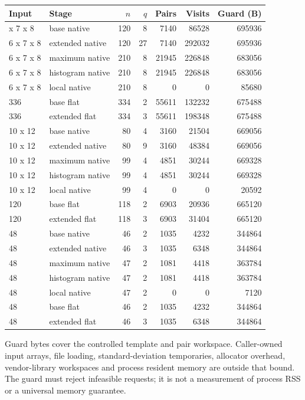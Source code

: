 \documentclass[
  english,
  11pt,
]{article}
\newcounter{none} %
\begin{document}
{\def\LTcaptype{none} %
\begin{longtable}[]{@{}llrrrrr@{}}
\toprule\noalign{}
Input & Stage & \(n\) & \(q\) & Pairs & Visits & Guard (B) \\
\midrule\noalign{}
\endhead
\bottomrule\noalign{}
\endlastfoot
6 x 7 x 8 & base native & 120 & 8 & 7140 & 86528 & 695936 \\
6 x 7 x 8 & extended native & 120 & 27 & 7140 & 292032 & 695936 \\
6 x 7 x 8 & maximum native & 210 & 8 & 21945 & 226848 & 683056 \\
6 x 7 x 8 & histogram native & 210 & 8 & 21945 & 226848 & 683056 \\
6 x 7 x 8 & local native & 210 & 8 & 0 & 0 & 85680 \\
336 & base flat & 334 & 2 & 55611 & 132232 & 675488 \\
336 & extended flat & 334 & 3 & 55611 & 198348 & 675488 \\
10 x 12 & base native & 80 & 4 & 3160 & 21504 & 669056 \\
10 x 12 & extended native & 80 & 9 & 3160 & 48384 & 669056 \\
10 x 12 & maximum native & 99 & 4 & 4851 & 30244 & 669328 \\
10 x 12 & histogram native & 99 & 4 & 4851 & 30244 & 669328 \\
10 x 12 & local native & 99 & 4 & 0 & 0 & 20592 \\
120 & base flat & 118 & 2 & 6903 & 20936 & 665120 \\
120 & extended flat & 118 & 3 & 6903 & 31404 & 665120 \\
48 & base native & 46 & 2 & 1035 & 4232 & 344864 \\
48 & extended native & 46 & 3 & 1035 & 6348 & 344864 \\
48 & maximum native & 47 & 2 & 1081 & 4418 & 363784 \\
48 & histogram native & 47 & 2 & 1081 & 4418 & 363784 \\
48 & local native & 47 & 2 & 0 & 0 & 7120 \\
48 & base flat & 46 & 2 & 1035 & 4232 & 344864 \\
48 & extended flat & 46 & 3 & 1035 & 6348 & 344864 \\
\end{longtable}
}

\endgroup

Guard bytes cover the controlled template and pair workspace.
Caller-owned input arrays, file loading, standard-deviation temporaries,
allocator overhead, vendor-library workspaces and process resident
memory are outside that bound. The guard must reject infeasible
requests; it is not a measurement of process RSS or a universal memory
guarantee.
\end{document}
